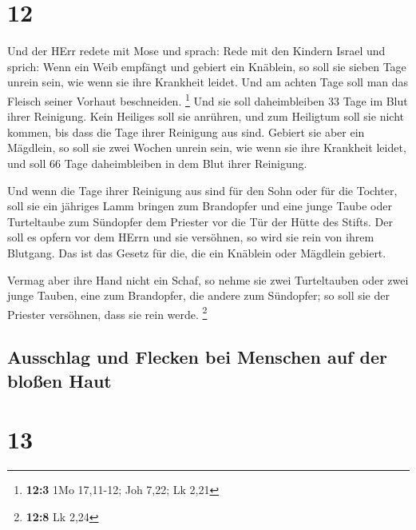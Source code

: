 \hypertarget{section-11}{%
\section{12}\label{section-11}}

 Und der HErr redete mit Mose und sprach: 
Rede mit den Kindern Israel und sprich: Wenn ein Weib empfängt und
gebiert ein Knäblein, so soll sie sieben Tage unrein sein, wie wenn sie
ihre Krankheit leidet.  Und am achten Tage soll man das
Fleisch seiner Vorhaut beschneiden. \footnote{\textbf{12:3} 1Mo
  17,11-12; Joh 7,22; Lk 2,21}  Und sie soll daheimbleiben
33 Tage im Blut ihrer Reinigung. Kein Heiliges soll sie anrühren, und
zum Heiligtum soll sie nicht kommen, bis dass die Tage ihrer Reinigung
aus sind.  Gebiert sie aber ein Mägdlein, so soll sie zwei
Wochen unrein sein, wie wenn sie ihre Krankheit leidet, und soll 66 Tage
daheimbleiben in dem Blut ihrer Reinigung.

 Und wenn die Tage ihrer Reinigung aus sind für den Sohn
oder für die Tochter, soll sie ein jähriges Lamm bringen zum Brandopfer
und eine junge Taube oder Turteltaube zum Sündopfer dem Priester vor die
Tür der Hütte des Stifts.  Der soll es opfern vor dem
HErrn und sie versöhnen, so wird sie rein von ihrem Blutgang. Das ist
das Gesetz für die, die ein Knäblein oder Mägdlein gebiert.

 Vermag aber ihre Hand nicht ein Schaf, so nehme sie zwei
Turteltauben oder zwei junge Tauben, eine zum Brandopfer, die andere zum
Sündopfer; so soll sie der Priester versöhnen, dass sie rein werde.
\footnote{\textbf{12:8} Lk 2,24}

\hypertarget{ausschlag-und-flecken-bei-menschen-auf-der-blouxdfen-haut}{%
\subsection{Ausschlag und Flecken bei Menschen auf der bloßen
Haut}\label{ausschlag-und-flecken-bei-menschen-auf-der-blouxdfen-haut}}

\hypertarget{section-12}{%
\section{13}\label{section-12}}


